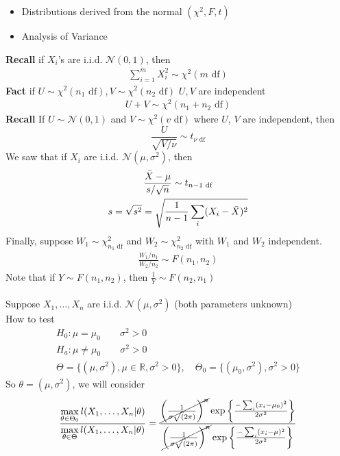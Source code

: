 \begin{itemize}
	\item Distributions derived from the normal $(\chi^2, F, t)$
	\item Analysis of Variance
\end{itemize}
\textbf{Recall} if $X_i$'s are i.i.d. $\mathcal{N}(0,1)$, then 
\begin{gather*}
	\sum_{i=1}^m X_i^2 \sim \chi^2 (m \text{ df})
\end{gather*}
\textbf{Fact} if $U \sim \chi^2 (n_1 \text{ df}), V\sim \chi^2 (n_2 \text{ df})$ $U, V$ are independent
\begin{gather*}
U + V \sim \chi^2(n_1 + n_2 \text{ df})	
\end{gather*}
\textbf{Recall} If $U \sim \mathcal{N}(0,1)$ and $V \sim \chi^2(v \text{ df})$ where $U$, $V$ are independent, then
\begin{equation*}
	\frac{U}{\sqrt{V / \nu}}\sim t_{\nu \text{ df}}
\end{equation*}
We saw that if $X_i$ are i.i.d. $\mathcal{N}(\mu, \sigma^2)$, then 
\begin{gather*}
	\frac{\bar{X} - \mu}{s / \sqrt{n}} \sim t_{n-1 \text{ df}}\\
	s = \sqrt{s^2} = \sqrt{\frac{1}{n-1} \sum_i (X_i - \bar{X})^2}
\end{gather*}
Finally, suppose $W_1 \sim \chi^2_{n_1 \text{ df}}$ and $W_2 \sim \chi^2_{n_2 \text{ df}}$ with $W_1$ and $W_2$ independent.
\begin{gather*}
	\frac{W_1/n_1}{W_2/n_2} \sim F(n_1, n_2)
\end{gather*}
Note that if $Y \sim F(n_1, n_2)$, then $\frac{1}{Y} \sim F(n_2, n_1)$\\\\
Suppose $X_1, \ldots, X_n$ are i.i.d. $\mathcal{N}(\mu, \sigma^2)$ (both parameters unknown)\\
How to test
\begin{gather*}
	H_0: \mu = \mu_0 \qquad \sigma^2 > 0\\
	H_a: \mu \neq \mu_0 \qquad \sigma^2 > 0\\
	\Theta = \{ (\mu, \sigma^2), \mu \in \mathbb{R}, \sigma^2 > 0 \}, \quad 	\Theta_0 = \{ (\mu_0, \sigma^2), \sigma^2 > 0 \}
\end{gather*}
So $\theta = (\mu, \sigma^2)$, we will consider
\begin{gather*}
	\frac{\max\limits_{\theta \in \Theta_0} l(X_1, \ldots, X_n | \theta) }{\max\limits_{\theta \in \Theta} l(X_1, \ldots, X_n | \theta) }  = \frac{\cancel{\bigg( \frac{1}{\sigma\sqrt(2\pi)} \bigg)^n} \exp \bigg\{ \frac{-\sum_i (x_i - \mu_0)^2}{2\sigma^2} \bigg\} }{\cancel{\bigg( \frac{1}{\sigma\sqrt(2\pi)} \bigg)^n} \exp \bigg\{ \frac{-\sum_i (x_i - \mu)^2}{2\sigma^2} \bigg\} }
\end{gather*}
